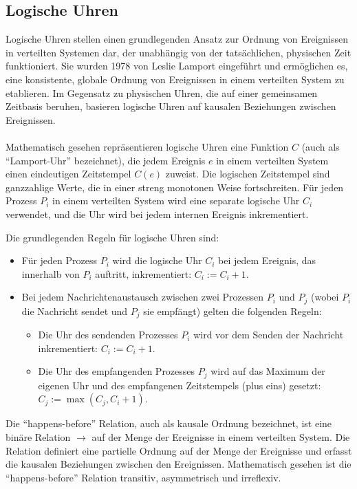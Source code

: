\subsection{Logische Uhren}
Logische Uhren stellen einen grundlegenden Ansatz zur Ordnung von Ereignissen in verteilten Systemen dar, der unabhängig von der tatsächlichen, physischen Zeit funktioniert. Sie wurden 1978 von Leslie Lamport eingeführt und ermöglichen es, eine konsistente, globale Ordnung von Ereignissen in einem verteilten System zu etablieren. Im Gegensatz zu physischen Uhren, die auf einer gemeinsamen Zeitbasis beruhen, basieren logische Uhren auf kausalen Beziehungen zwischen Ereignissen.
\\\\
Mathematisch gesehen repräsentieren logische Uhren eine Funktion $C$ (auch als \enquote{Lamport-Uhr} bezeichnet), die jedem Ereignis $e$ in einem verteilten System einen eindeutigen Zeitstempel $C(e)$ zuweist. Die logischen Zeitstempel sind ganzzahlige Werte, die in einer streng monotonen Weise fortschreiten. Für jeden Prozess $P_i$ in einem verteilten System wird eine separate logische Uhr $C_i$ verwendet, und die Uhr wird bei jedem internen Ereignis inkrementiert.

Die grundlegenden Regeln für logische Uhren sind:
\begin{itemize}
\item Für jeden Prozess $P_i$ wird die logische Uhr $C_i$ bei jedem Ereignis, das innerhalb von $P_i$ auftritt, inkrementiert: $C_i := C_i + 1$.
\item Bei jedem Nachrichtenaustausch zwischen zwei Prozessen $P_i$ und $P_j$ (wobei $P_i$ die Nachricht sendet und $P_j$ sie empfängt) gelten die folgenden Regeln:
\begin{itemize}
\item Die Uhr des sendenden Prozesses $P_i$ wird vor dem Senden der Nachricht inkrementiert: $C_i := C_i + 1$.
\item Die Uhr des empfangenden Prozesses $P_j$ wird auf das Maximum der eigenen Uhr und des empfangenen Zeitstempels (plus eins) gesetzt: $C_j := \max(C_j, C_i + 1)$.
\end{itemize}    
\end{itemize}

Die \enquote{happens-before} Relation, auch als kausale Ordnung bezeichnet, ist eine binäre Relation $\to$ auf der Menge der Ereignisse in einem verteilten System. Die Relation definiert eine partielle Ordnung auf der Menge der Ereignisse und erfasst die kausalen Beziehungen zwischen den Ereignissen. Mathematisch gesehen ist die \enquote{happens-before} Relation transitiv, asymmetrisch und irreflexiv.

